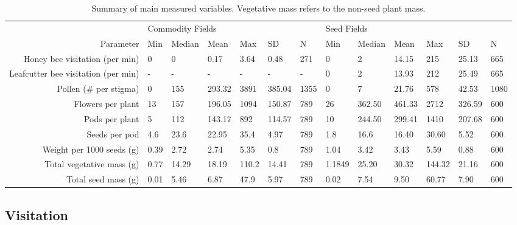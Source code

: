 \documentclass[12pt, draft]{article} %
\begin{document}
\begin{table}
\centering
\caption{Summary of main measured variables. Vegetative mass refers to the non-seed plant mass.}
\begin{tabular}{r|llllll|llllll}
                                       & \multicolumn{6}{l|}{Commodity Fields}           & \multicolumn{6}{l}{Seed Fields}                    \\
Parameter                              & Min  & Median & Mean   & Max   & SD     & N    & Min    & Median & Mean   & Max    & SD     & N     \\ \hline
Honey bee visitation (per min)      & 0    & 0      & 0.17   & 3.64  & 0.48   & 271  & 0      & 2      & 14.15  & 215    & 25.13  & 665   \\
Leafcutter bee visitation (per min) & -    & -      & -      & -     & -      & -    & 0      & 2      & 13.93  & 212    & 25.49  & 665   \\
Pollen (\# per stigma)                 & 0    & 155    & 293.32 & 3891  & 385.04 & 1355 & 0      & 7      & 21.76  & 578    & 42.53  & 1080  \\
Flowers per plant                      & 13   & 157    & 196.05 & 1094  & 150.87 & 789  & 26     & 362.50 & 461.33 & 2712   & 326.59 & 600   \\
Pods per plant                         & 5    & 112    & 143.17 & 892   & 114.57 & 789  & 10     & 244.50 & 299.41 & 1410   & 207.68 & 600   \\
Seeds per pod                          & 4.6  & 23.6   & 22.95  & 35.4  & 4.97   & 789  & 1.8    & 16.6   & 16.40  & 30.60  & 5.52   & 600   \\
Weight per 1000 seeds (g)              & 0.39 & 2.72   & 2.74   & 5.35  & 0.8    & 789  & 1.04   & 3.42   & 3.43   & 5.59   & 0.88   & 600  \\
Total vegetative mass (g)                    & 0.77 & 14.29  & 18.19  & 110.2 & 14.41  & 789  & 1.1849 & 25.20  & 30.32  & 144.32 & 21.16  & 600   \\
Total seed mass (g)                          & 0.01 & 5.46   & 6.87   & 47.9  & 5.97   & 789  & 0.02   & 7.54   & 9.50   & 60.77  & 7.90   & 600   
\end{tabular}
\end{table}


\subsection{Visitation}
\end{document}
